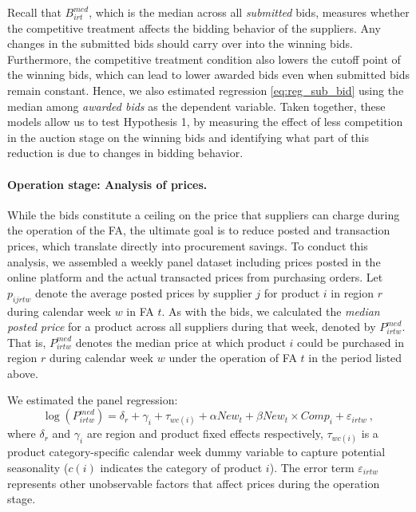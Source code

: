 Recall that $B^{med}_{irt}$, which is the median across all \textit{submitted} bids, measures whether the competitive treatment affects the bidding behavior of the suppliers.  Any changes in the submitted bids should carry over into the winning bids. Furthermore, the competitive treatment condition also lowers the cutoff point of the winning bids, which can lead to lower awarded bids even when submitted bids remain constant. Hence, we also estimated regression \eqref{eq:reg_sub_bid} using the median among \textit{awarded bids} as the dependent variable. Taken together, these models allow us to test Hypothesis 1, by measuring the effect of less competition in the auction stage on the winning bids and identifying what part of this reduction is due to changes in bidding behavior.



\paragraph{Operation stage: Analysis of prices.}
While the bids constitute a ceiling on the price that suppliers can charge during the operation of the FA, the ultimate goal is to reduce posted and transaction prices, which translate directly into procurement savings. To conduct this analysis, we assembled a weekly panel dataset including prices posted in the online platform and the actual transacted prices from purchasing orders. Let $p_{ijrtw}$ denote the average posted prices by supplier $j$ for product $i$ in region $r$ during calendar week $w$ in FA $t$. As with the bids, we calculated the {\em median posted price} for a product across all suppliers during that week, denoted by $P^{med}_{irtw}$. That is, $P^{med}_{irtw}$ denotes the median price at which product $i$ could be purchased in region $r$ during calendar week $w$ under the operation of FA $t$ in the period listed above. 

We estimated the panel regression:
\begin{equation}
    \log (P^{med}_{irtw})= \delta_r + \gamma_i + \tau_{wc(i)} + \alpha New_{t} + \beta New_{t}\times Comp_{i} + \varepsilon_{irtw} \ ,
    \label{eq:reg_op_posted}
\end{equation}
\noindent where $\delta_r$ and $\gamma_i$ are region and product fixed effects respectively, $\tau_{wc(i)}$ is a product category-specific calendar week dummy variable to capture potential seasonality ($c(i)$ indicates the category of product $i$). {The error term $\varepsilon_{irtw}$ represents other unobservable factors that affect prices during the operation stage.}


